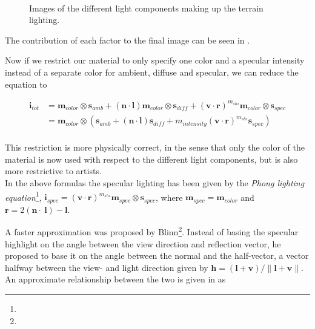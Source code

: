 \begin{figure}
  \centering
  \\
  \caption{Images of the different light components making up the
    terrain lighting.}
  \label{fig:lightComponents}
\end{figure}


The contribution of each factor to the final image can be seen in
.

Now if we restrict our material to only specify one color and a
specular intensity instead of a separate color for ambient, diffuse and
specular, we can reduce the equation to

\begin{displaymath}
  \begin{array}{rl}
    \mathbf{i}_{tot} &= \mathbf{m}_{color} \otimes \mathbf{s}_{amb} + (\mathbf{n} \cdot
    \mathbf{l}) \mathbf{m}_{color} \otimes \mathbf{s}_{diff} +
    (\mathbf{v} \cdot \mathbf{r})^{m_{shi}} \mathbf{m}_{color} \otimes
    \mathbf{s}_{spec} \\
    &= \mathbf{m}_{color} \otimes (\mathbf{s}_{amb} + (\mathbf{n} \cdot
    \mathbf{l}) \mathbf{s}_{diff} + m_{intensity} (\mathbf{v} \cdot
    \mathbf{r})^{m_{shi}} \mathbf{s}_{spec}) \\
  \end{array}
\end{displaymath}

This restriction is more physically correct, in the sense that only
the color of the material is now used with respect to the different
light components, but is also more restrictive to artists.\\

In the above formulas the specular lighting has been given by the
\emph{Phong lighting equation}\footnote{},
$\mathbf{i}_{spec} = (\mathbf{v} \cdot \mathbf{r})^{m_{shi}}
\mathbf{m}_{spec} \otimes \mathbf{s}_{spec}$, where $\mathbf{m}_{spec}
= \mathbf{m}_{color}$ and $\mathbf{r} = 2 (\mathbf{n} \cdot
\ \mathbf{l}) - \mathbf{l}$.

A faster approximation was proposed by
Blinn\footnote{}. Instead of basing the
specular highlight on the angle between the view direction and
reflection vector, he proposed to base it on the angle between the
normal and the half-vector, a vector halfway between the view- and
light direction given by $\mathbf{h} = (\mathbf{l} + \mathbf{v}) /
\|\mathbf{l} + \mathbf{v}\|$. An approximate relationship between the
two is given in  as

